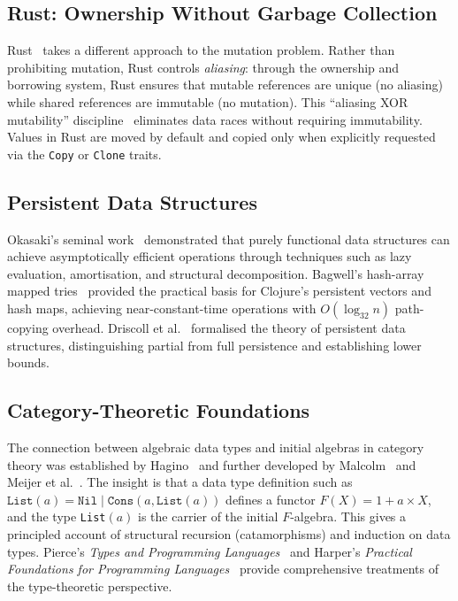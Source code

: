 \documentclass[11pt]{article}
\theoremstyle{definition}
\theoremstyle{remark}
\begin{document}
\subsection{Rust: Ownership Without Garbage Collection}

Rust~\cite{matsakis2014rust,klabnik2019rust} takes a different approach
to the mutation problem.  Rather than prohibiting mutation, Rust
controls \emph{aliasing}: through the ownership and borrowing system,
Rust ensures that mutable references are unique (no aliasing) while
shared references are immutable (no mutation).  This ``aliasing XOR
mutability'' discipline~\cite{jung2017rustbelt} eliminates data races
without requiring immutability.  Values in Rust are moved by default
and copied only when explicitly requested via the \texttt{Copy} or
\texttt{Clone} traits.

\subsection{Persistent Data Structures}

Okasaki's seminal work~\cite{okasaki1999purely} demonstrated that
purely functional data structures can achieve asymptotically efficient
operations through techniques such as lazy evaluation, amortisation,
and structural decomposition.  Bagwell's hash-array mapped
tries~\cite{bagwell2001ideal} provided the practical basis for
Clojure's persistent vectors and hash maps, achieving near-constant-time
operations with $O(\log_{32} n)$ path-copying overhead.  Driscoll
et al.~\cite{driscoll1989making} formalised the theory of persistent
data structures, distinguishing partial from full persistence and
establishing lower bounds.

\subsection{Category-Theoretic Foundations}

The connection between algebraic data types and initial algebras in
category theory was established by Hagino~\cite{hagino1987category}
and further developed by Malcolm~\cite{malcolm1990algebraic} and
Meijer et al.~\cite{meijer1991functional}.  The insight is that a
data type definition such as $\texttt{List}(a) = \texttt{Nil} \mid
\texttt{Cons}(a, \texttt{List}(a))$ defines a functor $F(X) = 1 + a
\times X$, and the type \texttt{List}$(a)$ is the carrier of the
initial $F$-algebra.  This gives a principled account of structural
recursion (catamorphisms) and induction on data types.  Pierce's
\emph{Types and Programming Languages}~\cite{pierce2002types} and
Harper's \emph{Practical Foundations for Programming
Languages}~\cite{harper2016practical} provide comprehensive
treatments of the type-theoretic perspective.
\end{document}

